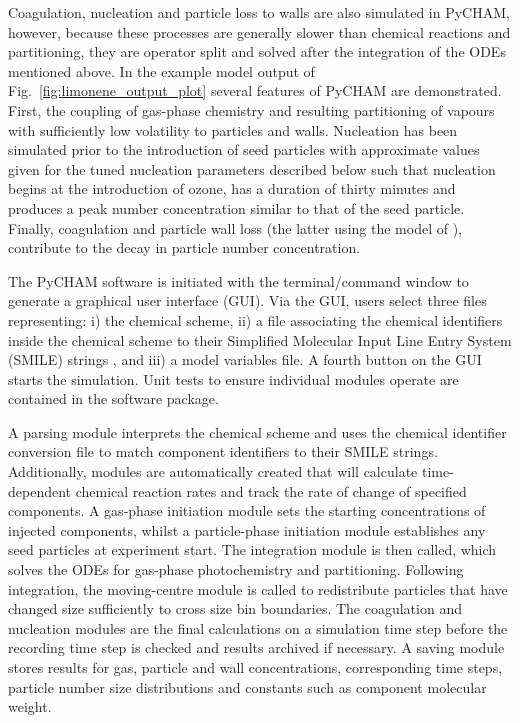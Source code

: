 \documentclass[gmd, manuscript]{copernicus}
\begin{document}
Coagulation, nucleation and particle loss to walls are also simulated in PyCHAM, however, because these processes are generally slower than chemical reactions and partitioning, they are operator split and solved after the integration of the ODEs mentioned above.  In the example model output of Fig.~\ref{fig:limonene_output_plot} several features of PyCHAM are demonstrated.  First, the coupling of gas-phase chemistry and resulting partitioning of vapours with sufficiently low volatility to particles and walls.  Nucleation has been simulated prior to the introduction of seed particles with approximate values given for the tuned nucleation parameters described below such that nucleation begins at the introduction of ozone, has a duration of thirty minutes and produces a peak number concentration similar to that of the seed particle.  Finally, coagulation and particle wall loss (the latter using the model of \citet{McMurry1985}), contribute to the decay in particle number concentration.

The PyCHAM software is initiated with the terminal/command window to generate a graphical user interface (GUI).  Via the GUI, users select three files  representing: i) the chemical scheme, ii) a file associating the chemical identifiers inside the chemical scheme to their Simplified Molecular Input Line Entry System (SMILE) strings \citep{Weininger1988}, and iii) a model variables file.  A fourth button on the GUI starts the simulation.  Unit tests to ensure individual modules operate are contained in the software package.

A parsing module interprets the chemical scheme and uses the chemical identifier conversion file to match component identifiers to their SMILE strings.  Additionally, modules are automatically created that will calculate time-dependent chemical reaction rates and track the rate of change of specified components.  A gas-phase initiation module sets the starting concentrations of injected components, whilst a particle-phase initiation module establishes any seed particles at experiment start.  The integration module is then called, which solves the ODEs for gas-phase photochemistry and partitioning.  Following integration, the moving-centre module is called to redistribute particles that have changed size sufficiently to cross size bin boundaries.  The coagulation and nucleation modules are the final calculations on a simulation time step before the recording time step is checked and results archived if necessary.  A saving module stores results for gas, particle and wall concentrations, corresponding time steps, particle number size distributions and constants such as component molecular weight.
\end{document}
